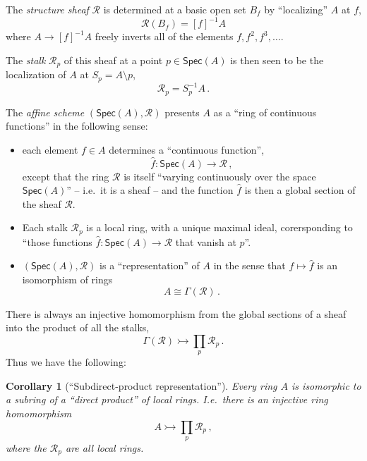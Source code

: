 \documentclass[12pt]{article}
\newtheorem*{corollary*}{Corollary}
\theoremstyle{remark}
\theoremstyle{definition}
\newcommand{\myemph}[1]{\emph{#1}}
\begin{document}
The \myemph{structure sheaf} $\mathcal {R}$ is determined at a basic open set $B_f$ by ``localizing'' $A$ at $f$,
\[
\mathcal{R}(B_f) = [f]^{-1}A
\]
where $A \rightarrow [f]^{-1}A$ freely inverts all of the elements $f, f^2, f^3, \dots$.
\medskip

The \myemph{stalk} $\mathcal {R}_p$ of this sheaf at a point $p\in\mathsf{Spec}(A)$ is then seen to be the localization of $A$ at $S_p = A\setminus p$,
\[
\mathcal{R}_p = S^{-1}_p{A}\,.
\]


The \myemph{affine scheme} $(\mathsf{Spec}(A), \mathcal {R})$ presents $A$ as a ``ring of continuous functions'' in the following sense: 
\begin{itemize}
\item each element $f\in A$ determines a ``continuous function'',
\[
\hat{f} : \mathsf{Spec}(A) \to \mathcal {R}\,,
\]
except that the ring $\mathcal{R}$ is itself ``varying continuously over the space $\mathsf{Spec}(A)$'' -- i.e.\ it is a sheaf -- and the function $\hat{f}$ is then a global section of the sheaf $\mathcal{R}$.  

\item Each stalk $\mathcal{R}_p$ is a local ring, with a unique maximal ideal, corersponding to ``those functions  $\hat{f} : \mathsf{Spec}(A) \to \mathcal{R}$ that vanish at $p$''.

\item $(\mathsf{Spec}(A), \mathcal {R})$ is a ``representation'' of $A$ in the sense that $f\mapsto\hat{f}$ is an isomorphism of rings
\[
A \cong \Gamma(\mathcal{R})\,.
\]
\end{itemize}

There is always an injective homomorphism from the global sections of a sheaf into the product of all the stalks,
\[
\Gamma(\mathcal{R}) \rightarrowtail \prod_{p}\mathcal{R}_p \,.
\]
Thus we have the following:

\begin{corollary*}[``Subdirect-product representation'']
Every ring $A$ is isomorphic to a {sub}ring of a ``direct product'' of local rings.
I.e.\ there is an injective ring homomorphism
\[
A \rightarrowtail \prod_{p}\mathcal{R}_p \,,
\]
where the $\mathcal{R}_p$ are all local rings.
\end{corollary*}
\end{document}
